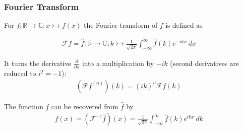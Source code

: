 \subsubsection{Fourier Transform}

For $f : \mathbb{R}\to\mathbb{C} : x \rightarrowtail f(x)$ the Fourier transform of $f$ is defined as

\begin{align*}
    \mathcal{F}f = \hat{f} : \mathbb{R}\to\mathbb{C} : k\rightarrowtail
    \frac{1}{\sqrt{2\pi}}\int_{-\infty}^{\infty}\hat{f}(k)e^{-ikx}\ dx
\end{align*}

It turns the derivative $\frac{\partial}{\partial x}$ into a multiplication by $-ik$ (second derivatives are reduced to $i^2=-1$):
\begin{align*}
	(\mathcal{F}f^{(n)})(k) = (ik)^n\mathcal{F}f(k)
\end{align*}

The function $f$ can be recovered from $\hat{f}$ by
\begin{align*}
    f(x)=(\mathcal{F}^{-1}\hat{f})(x)
    = \frac{1}{\sqrt{2\pi}}\int_{-\infty}^\infty \hat{f}(k) e^{ikx}\ dk
\end{align*}
